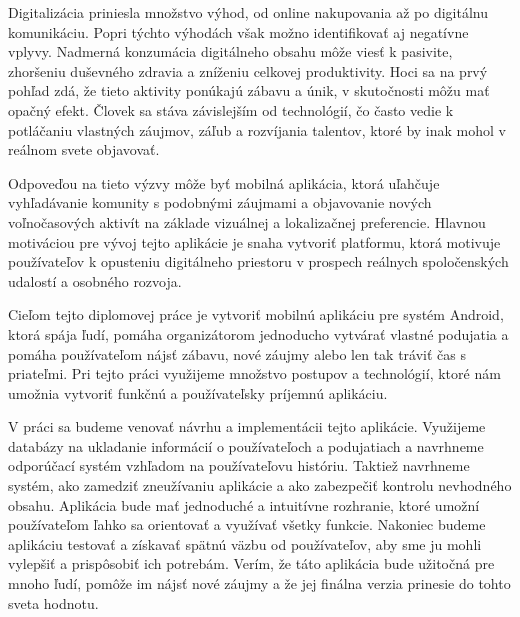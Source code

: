 Digitalizácia priniesla množstvo výhod, od online nakupovania až po digitálnu komunikáciu.
Popri týchto výhodách však možno identifikovať aj negatívne vplyvy. 
Nadmerná konzumácia digitálneho obsahu môže viesť k pasivite, zhoršeniu duševného zdravia a zníženiu celkovej produktivity. 
Hoci sa na prvý pohľad zdá, že tieto aktivity ponúkajú zábavu a únik, 
v skutočnosti môžu mať opačný efekt. Človek sa stáva závislejším od technológií,
čo často vedie k potláčaniu vlastných záujmov, záľub a rozvíjania talentov,
 ktoré by inak mohol v reálnom svete objavovať.

Odpoveďou na tieto výzvy môže byť mobilná aplikácia, ktorá uľahčuje vyhľadávanie komunity s podobnými záujmami
 a objavovanie nových voľnočasových aktivít na základe vizuálnej a lokalizačnej preferencie.
  Hlavnou motiváciou pre vývoj tejto aplikácie je snaha vytvoriť platformu, ktorá motivuje používateľov 
  k opusteniu digitálneho priestoru v prospech reálnych spoločenských udalostí a osobného rozvoja.

Cieľom tejto diplomovej práce je vytvoriť mobilnú aplikáciu pre 
systém Android, ktorá spája ľudí, pomáha organizátorom jednoducho
vytvárať vlastné podujatia a pomáha používateľom nájsť zábavu, nové 
záujmy alebo len tak tráviť čas s priateľmi. Pri tejto práci využijeme 
množstvo postupov a technológií, ktoré nám umožnia vytvoriť funkčnú 
a používateľsky príjemnú aplikáciu.

V práci sa budeme venovať návrhu a implementácii tejto aplikácie. 
Využijeme databázy na ukladanie informácií o používateľoch a podujatiach 
a navrhneme odporúčací systém vzhľadom na používateľovu históriu.
Taktiež navrhneme systém, ako zamedziť zneužívaniu aplikácie a ako 
zabezpečiť kontrolu nevhodného obsahu. Aplikácia bude mať jednoduché 
a intuitívne rozhranie, ktoré umožní používateľom ľahko sa orientovať
a využívať všetky funkcie. Nakoniec budeme aplikáciu testovať a 
získavať spätnú väzbu od používateľov, aby sme ju mohli vylepšiť a 
prispôsobiť ich potrebám. Verím, že táto aplikácia bude užitočná pre
mnoho ľudí, pomôže im nájsť nové záujmy a že jej finálna verzia
prinesie do tohto sveta hodnotu.
